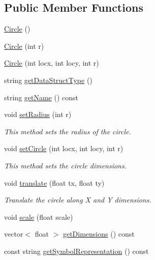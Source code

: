 \subsection*{Public Member Functions}
\begin{DoxyCompactItemize}
\item 
\hyperlink{classbridges_1_1datastructure_1_1_circle_a2106fef85f001fbd2de2d9870a432ef8}{Circle} ()
\item 
\hyperlink{classbridges_1_1datastructure_1_1_circle_aafbf518a6d7defa3d69d46d4bdda41da}{Circle} (int r)
\item 
\hyperlink{classbridges_1_1datastructure_1_1_circle_acde4da631bd56847058a29f03417ea4e}{Circle} (int locx, int locy, int r)
\item 
string \hyperlink{classbridges_1_1datastructure_1_1_circle_a366d6a7488f926c1d63d6480fc52e791}{get\+Data\+Struct\+Type} ()
\item 
string \hyperlink{classbridges_1_1datastructure_1_1_circle_a3c7808f7918cb01ceaa3f6bf46e6bee5}{get\+Name} () const
\item 
void \hyperlink{classbridges_1_1datastructure_1_1_circle_a5b93bf688d56c7781390e6f207501313}{set\+Radius} (int r)
\begin{DoxyCompactList}\small\item\em This method sets the radius of the circle. \end{DoxyCompactList}\item 
void \hyperlink{classbridges_1_1datastructure_1_1_circle_ab9a1f6a9b76bb4e19b7f5c3e19a0f37f}{set\+Circle} (int locx, int locy, int r)
\begin{DoxyCompactList}\small\item\em This method sets the circle dimensions. \end{DoxyCompactList}\item 
void \hyperlink{classbridges_1_1datastructure_1_1_circle_ac21454141030b7c5af288ddbe2028111}{translate} (float tx, float ty)
\begin{DoxyCompactList}\small\item\em Translate the circle along X and Y dimensions. \end{DoxyCompactList}\item 
void \hyperlink{classbridges_1_1datastructure_1_1_circle_a77c35a4e0a69f8ba1b71c0c40c727eab}{scale} (float scale)
\item 
vector$<$ float $>$ \hyperlink{classbridges_1_1datastructure_1_1_circle_ae70d478b0901e4c492eff1be4f01c33c}{get\+Dimensions} () const
\item 
const string \hyperlink{classbridges_1_1datastructure_1_1_circle_a796c88ccb8c5529d45aa7271a34fa3fe}{get\+Symbol\+Representation} () const
\end{DoxyCompactItemize}
